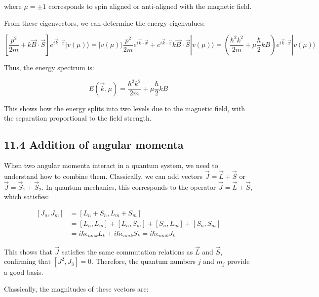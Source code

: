 \documentclass[10pt]{article}
\begin{document}
where $\mu = \pm 1$ corresponds to spin aligned or anti-aligned with the magnetic field.


From these eigenvectors, we can determine the energy eigenvalues:

\begin{equation*}
\left[\frac{p^{2}}{2 m}+k \vec{B} \cdot \vec{S}\right] e^{i \vec{k} \cdot \vec{x}}|v(\mu)\rangle=|v(\mu)\rangle \frac{p^{2}}{2 m} e^{i \vec{k} \cdot \vec{x}}+e^{i \vec{k} \cdot \vec{x}} k \vec{B} \cdot \vec{S}|v(\mu)\rangle=\left(\frac{\hbar^{2} k^{2}}{2 m}+\mu \frac{\hbar}{2} k B\right) e^{i \vec{k} \cdot \vec{x}}|v(\mu)\rangle \tag{11.34}
\end{equation*}

Thus, the energy spectrum is:

\begin{equation*}
E(\vec{k}, \mu)=\frac{\hbar^{2} k^{2}}{2 m}+\mu \frac{\hbar}{2} k B \tag{11.35}
\end{equation*}

This shows how the energy splits into two levels due to the magnetic field, with the separation proportional to the field strength.

\subsection*{11.4 Addition of angular momenta}
When two angular momenta interact in a quantum system, we need to understand how to combine them. Classically, we can add vectors $\vec{J}=\vec{L}+\vec{S}$ or $\vec{J}=\vec{S}_1+\vec{S}_2$. In quantum mechanics, this corresponds to the operator $\vec{J}=\vec{L}+\vec{S}$, which satisfies:

\begin{align*}
\left[J_{n}, J_{m}\right] &= \left[L_{n}+S_{n}, L_{m}+S_{m}\right]\\
&= \left[L_{n}, L_{m}\right]+\left[L_{n}, S_{m}\right]+\left[S_{n}, L_{m}\right]+\left[S_{n}, S_{m}\right]\\
&= i \hbar \epsilon_{n m k} L_{k}+i \hbar \epsilon_{n m k} S_{k}=i \hbar \epsilon_{n m k} J_{k} \tag{11.36}
\end{align*}

This shows that $\vec{J}$ satisfies the same commutation relations as $\vec{L}$ and $\vec{S}$, confirming that $\left[J^{2}, J_{3}\right]=0$. Therefore, the quantum numbers $j$ and $m_j$ provide a good basis.

Classically, the magnitudes of these vectors are:
\end{document}
